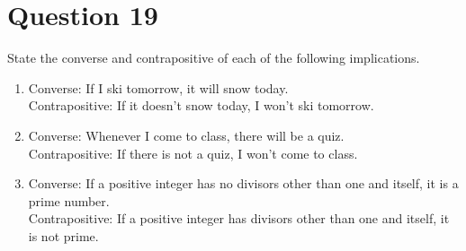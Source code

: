 \documentclass[12pt]{extarticle}
\begin{document}
\section*{Question 19}
	State the converse and contrapositive of each of the following implications.
	\begin{enumerate}
		\item Converse: If I ski tomorrow, it will snow today.\\
			  Contrapositive: If it doesn't snow today, I won't ski tomorrow.
		\item Converse: Whenever I come to class, there will be a quiz.\\
			  Contrapositive: If there is not a quiz, I won't come to class.
		\item Converse: If a positive integer has no divisors other than one and itself, it is a prime number.\\
			  Contrapositive: If a positive integer has divisors other than one and itself, it is not prime.
	\end{enumerate}
\end{document}
